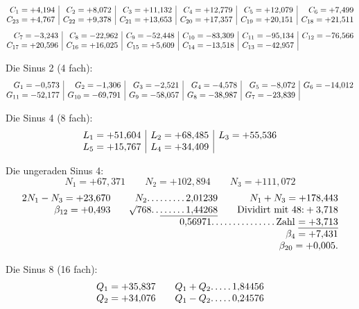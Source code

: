 \begin{landscape}
\[\begin{array}{@{}r|r|r|r|r|r@{}}
C_1=+4{,}194&C_2=+8{,}072&C_3=+11{,}132&C_4=+12{,}779&C_5=+12{,}079&C_6=+7{,}499\\
C_{23}=+4{,}767&C_{22}=+9{,}378&C_{21}=+13{,}653&C_{20}=+17{,}357&C_{19}=+20{,}151&C_{18}=+21{,}511
\end{array}
\]
\[
\begin{array}{@{}r|r|r|r|r|r@{}}
C_7=-3{,}243&C_8=-22{,}962&C_9=-52{,}448&C_{10}=-83{,}309&C_{11}=-95{,}134&C_{12}=-76{,}566\\
C_{17}=+20{,}596&C_{16}=+16{,}025&C_{15}=+5{,}609&C_{14}=-13{,}518&C_{13}=-42{,}957&
\end{array}
\]
\par\noindent\hspace*{\parindent}Die Sinus 2 (4 fach):
\[
\begin{array}{@{}r|r|r|r|r|r@{}}
G_1=-0{,}573&G_2=-1{,}306&G_3=-2{,}521&G_4=-4{,}578&G_5=-8{,}072&G_6=-14{,}012\\
G_{11}=-52{,}177&G_{10}=-69{,}791&G_9=-58{,}057&G_8=-38{,}987&G_7=-23{,}839&
\end{array}
\]
\clearpage{}
\par\noindent\hspace*{\parindent}Die Sinus 4 (8 fach):
\[
\begin{array}{@{}r|r|r@{}}
L_1=+51{,}604&L_2=+68{,}485&L_3=+55{,}536\\
L_5=+15{,}767&L_4=+34{,}409&
\end{array}
\]
\par\noindent\hspace*{\parindent}Die ungeraden Sinus 4:
\[N_1=+67{,}371\qquad N_2=+102{,}894\qquad N_3=+111{,}072\]
\[
\begin{array}{@{}r@{\qquad}r@{\qquad}r@{}}
2N_1-N_3=+23{,}670&N_2\VfourDots{8}2{,}01239&N_1+N_3=+178{,}443\\
\beta_{12}=+0{,}493&\BareRoot{768}\VfourDots{1}\underline{\VfourDots{5}1{,}44268}&\text{Dividirt mit 48:}+3{,}718\\
&\multicolumn{2}{r@{}}{0{,}56971\VfourDots{14}\text{Zahl}\ \underline{=+3{,}713}}\\
&&\beta_4=+7{,}431\\
&&\beta_{20}=+0{,}005.
\end{array}
\]
\par\noindent\hspace*{\parindent}Die Sinus 8 (16 fach):
\[
\begin{array}{@{}r@{\qquad}r@{}}
Q_1=+35{,}837&Q_1+Q_2\VfourDots{4}1{,}84456\\
Q_2=+34{,}076&Q_1-Q_2\VfourDots{4}0{,}24576\\

\end{array}\]
\end{landscape}
